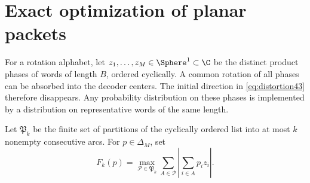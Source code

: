 \section{Exact optimization of planar packets}\label{sec:circle}
For a rotation alphabet, let $z_1,\ldots,z_M\in\Sphere^1\subset\C$ be the distinct product phases of words of length $B$, ordered cyclically. A common rotation of all phases can be absorbed into the decoder centers. The initial direction in \eqref{eq:distortion43} therefore disappears. Any probability distribution on these phases is implemented by a distribution on representative words of the same length.

Let $\mathfrak P_k$ be the finite set of partitions of the cyclically ordered list into at most $k$ nonempty consecutive arcs. For $p\in\Delta_M$, set
\begin{equation}\label{eq:partition-value}
 F_k(p)=\max_{\mathcal P\in\mathfrak P_k}
                \sum_{A\in\mathcal P}\left|\sum_{i\in A}p_i z_i\right|.
\end{equation}

